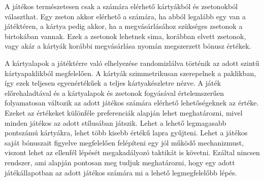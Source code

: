 A játékos természetesen csak a számára elérhető kártyákból és zsetonokból választhat. Egy zseton akkor elérhető a számára, ha abból legalább egy van a játéktéren, a kártya pedig akkor, ha a megvásárlásához szükséges zsetonok a birtokában vannak. Ezek a zsetonok lehetnek sima, korábban elvett zsetonok, vagy akár a kártyák korábbi megvásárlása nyomán megszerzett bónusz értékek.\par

A kártyalapok a játéktérre való elhelyezése randomizlálva történik az adott szintű kártyapaklikból megfelelően. A kártyák szimmetrikusan szerepelnek a paklikban, így ezek teljesen egyenértékűek a teljes kártyakészletre nézve. A játék előrehaladtával és a kártyalapok és zsetonok fogyásával értelemszerűen folyamatosan változik az adott játékos számára elérhető lehetőségeknek az értéke. Ezeket az értékeket különféle preferenciák alapján lehet meghatározni, mivel minden játékos az adott stílusában játszik. Lehet a lehető legmagasabb pontszámú kártyákra, lehet több kisebb értékű lapra gyűjteni. Lehet a játékos saját bónuszait figyelve megfelelően felépíteni egy jól működő mechanizmust, viszont lehet az ellenfél lépését megakadályozó taktikát is követni. Ezáltal nincsen rendszer, ami alapján pontosan meg tudjuk meghatározni, hogy egy adott játékállapotban az adott játékos számára mi a lehető legmegfelelőbb lépés.\par

